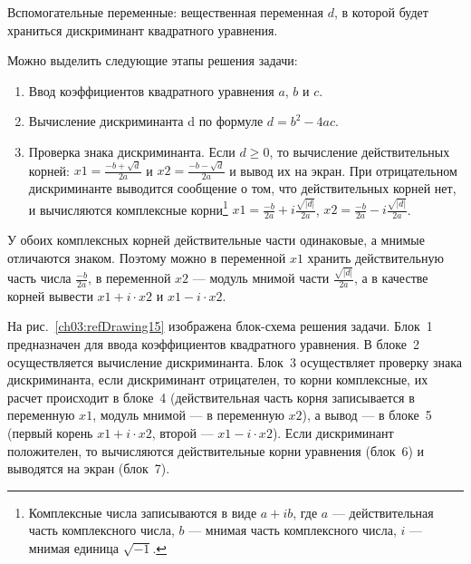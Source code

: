 Вспомогательные переменные: вещественная переменная $d$, в которой будет храниться дискриминант
квадратного уравнения.

Можно выделить следующие этапы решения задачи:
\begin{enumerate}
\item Ввод коэффициентов квадратного уравнения $a$, $b$ и $c$.
\item Вычисление дискриминанта d по формуле  $d=b^2-4ac$.
\item Проверка знака дискриминанта. Если $d\geqslant 0$, то вычисление действительных корней:
 $x1=\frac{-b+\sqrt{d}}{2a}$  и  $x2=\frac{-b-\sqrt{d}}{2a}$ 
и вывод их на экран. При отрицательном дискриминанте выводится сообщение о том, что действительных корней нет, и
вычисляются комплексные корни\footnote{Комплексные числа записываются в виде
$a+ib$, где $a$ --- действительная часть комплексного числа,
$b$ --- мнимая часть комплексного числа, $i$ --- мнимая единица  $\sqrt{-1}$.}
 $x1=\frac{-b}{2a}+i\frac{\sqrt{\left|{d}\right|}}{2a}$, 
$x2=\frac{-b}{2a}-i\frac{\sqrt{\left|{d}\right|}}{2a}$.
\end{enumerate}

У обоих комплексных корней действительные части одинаковые, а мнимые отличаются знаком. Поэтому можно в переменной
$x1$ хранить действительную часть числа  $\frac{-b}{2a}$, в переменной $x2$ --- модуль мнимой части 
$\frac{\sqrt{\left|{d}\right|}}{2a}$, а в качестве корней вывести 
$x1 + i\cdot x2$  и  $x1 - i\cdot x2$. 

На рис.~\ref{ch03:refDrawing15} изображена блок-схема решения задачи. Блок~1 предназначен для ввода коэффициентов квадратного
уравнения. В блоке~2 осуществляется вычисление дискриминанта. Блок~3 осуществляет проверку знака дискриминанта, если
дискриминант отрицателен, то корни комплексные, их расчет происходит в блоке~4 (действительная часть корня записывается
в переменную $x1$, модуль мнимой --- в переменную $x2$), а вывод --- в блоке~5 (первый
корень $x1 + i\cdot x2$, второй --- $x1 - i\cdot x2$). Если дискриминант положителен, то
вычисляются действительные корни уравнения (блок~6) и выводятся на экран (блок~7).


